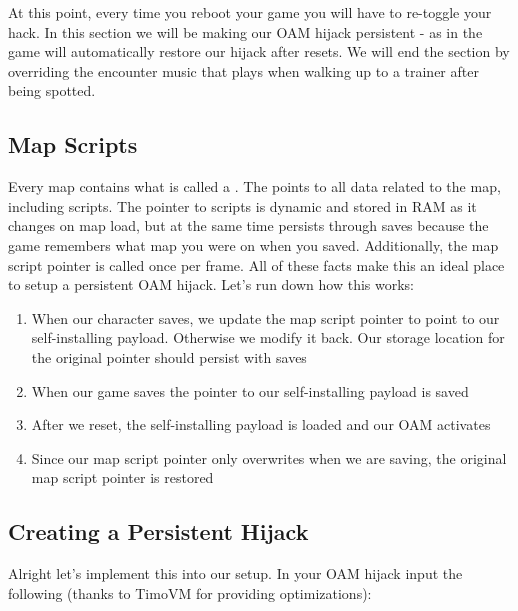 \documentclass[../main.tex]{subfiles}
\begin{document}
    At this point, every time you reboot your game you will have to re-toggle your hack.  In this section we will be making our OAM hijack persistent - as in the game will automatically restore our hijack after resets.  We will end the section by overriding the encounter music that plays when walking up to a trainer after being spotted.

    \subsection{Map Scripts}
    Every map contains what is called a \mapheader{}.  The \mapheader{} points to all data related to the map, including scripts.  The pointer to scripts is dynamic and stored in RAM as it changes on map load, but at the same time persists through saves because the game remembers what map you were on when you saved.  Additionally, the map script pointer is called once per frame.  All of these facts make this an ideal place to setup a persistent OAM hijack.  Let's run down how this works:

    \begin{enumerate}
        \item When our character saves, we update the map script pointer to point to our self-installing payload.  Otherwise we modify it back.  Our storage location for the original pointer should persist with saves
        \item When our game saves the pointer to our self-installing payload is saved
        \item After we reset, the self-installing payload is loaded and our OAM activates
        \item Since our map script pointer only overwrites when we are saving, the original map script pointer is restored
    \end{enumerate}

    \subsection{Creating a Persistent Hijack}
    Alright let's implement this into our setup.  In your OAM hijack input the following (thanks to TimoVM for providing optimizations):
\end{document}
